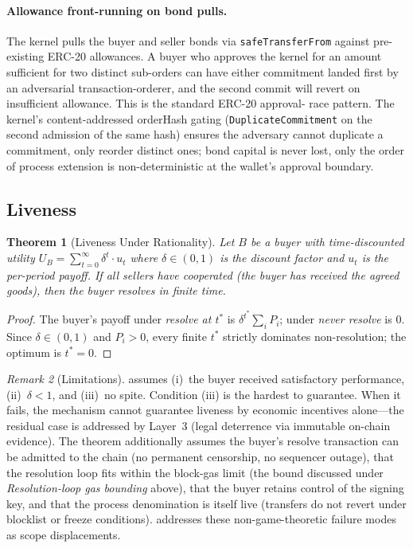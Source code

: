 \documentclass[11pt,a4paper]{article}
\newtheorem{theorem}{Theorem}[section]
\theoremstyle{definition}
\theoremstyle{remark}
\newtheorem{remark}[theorem]{Remark}
\newcommand{\pay}{P}
\begin{document}
\paragraph{Allowance front-running on bond pulls.}
The kernel pulls the buyer and seller bonds via
\texttt{safeTransferFrom} against pre-existing ERC-20 allowances.
A buyer who approves the kernel for an amount sufficient for two
distinct sub-orders can have either commitment landed first by an
adversarial transaction-orderer, and the second commit will revert
on insufficient allowance. This is the standard ERC-20 approval-
race pattern. The kernel's content-addressed orderHash gating
(\texttt{DuplicateCommitment} on the second admission of the same
hash) ensures the adversary cannot duplicate a commitment, only
reorder distinct ones; bond capital is never lost, only the order
of process extension is non-deterministic at the wallet's approval
boundary.

\subsection{Liveness}

\begin{theorem}[Liveness Under Rationality]
\label{thm:liveness}
Let $B$ be a buyer with time-discounted utility
$U_B = \sum_{t=0}^{\infty} \delta^t \cdot u_t$ where
$\delta \in (0, 1)$ is the discount factor and $u_t$ is the
per-period payoff. If all sellers have cooperated (the buyer has
received the agreed goods), then the buyer resolves in finite time.
\end{theorem}

\begin{proof}
The buyer's payoff under \emph{resolve at $t^*$} is $\delta^{t^*}
\sum_i \pay_i$; under \emph{never resolve} is $0$. Since
$\delta \in (0,1)$ and $\pay_i > 0$, every finite $t^*$ strictly
dominates non-resolution; the optimum is $t^* = 0$.
\end{proof}

\begin{remark}[Limitations]
\label{rem:liveness-limitations}
 assumes (i)~the buyer received satisfactory
performance, (ii)~$\delta < 1$, and (iii)~no spite. Condition (iii)
is the hardest to guarantee. When it fails, the mechanism cannot
guarantee liveness by economic incentives alone---the residual case
is addressed by Layer~3 (legal deterrence via immutable on-chain
evidence). The theorem additionally assumes the buyer's resolve
transaction can be admitted to the chain (no permanent censorship,
no sequencer outage), that the resolution loop fits within the
block-gas limit (the bound discussed under
\emph{Resolution-loop gas bounding} above), that the buyer retains
control of the signing key, and that the process denomination is
itself live (transfers do not revert under blocklist or freeze
conditions).  addresses these non-game-theoretic
failure modes as scope displacements.
\end{remark}
\end{document}
